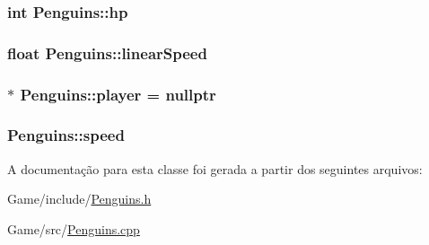 \hypertarget{classPenguins_a1d82db553867d4b84d2ce30c037c5882}{
\subsubsection[{hp}]{\setlength{\rightskip}{0pt plus 5cm}int Penguins\+::hp\hspace{0.3cm}{\ttfamily [private]}}}\label{classPenguins_a1d82db553867d4b84d2ce30c037c5882}
\hypertarget{classPenguins_a43abb7eaf4714f886be6c25babcdcb30}{
\subsubsection[{linear\+Speed}]{\setlength{\rightskip}{0pt plus 5cm}float Penguins\+::linear\+Speed\hspace{0.3cm}{\ttfamily [private]}}}\label{classPenguins_a43abb7eaf4714f886be6c25babcdcb30}
\hypertarget{classPenguins_a7d530cec6ba98b902c6120a90d574c0f}{
\subsubsection[{player}]{ $\ast$ Penguins\+::player = nullptr\hspace{0.3cm}{\ttfamily [static]}}}\label{classPenguins_a7d530cec6ba98b902c6120a90d574c0f}
\hypertarget{classPenguins_a7465442ffa391ddbe59486cf8475abcb}{
\subsubsection[{speed}]{ Penguins\+::speed\hspace{0.3cm}{\ttfamily [private]}}}\label{classPenguins_a7465442ffa391ddbe59486cf8475abcb}


A documentação para esta classe foi gerada a partir dos seguintes arquivos\+:\begin{DoxyCompactItemize}
\item 
Game/include/\hyperlink{Penguins_8h}{Penguins.\+h}\item 
Game/src/\hyperlink{Penguins_8cpp}{Penguins.\+cpp}\end{DoxyCompactItemize}
